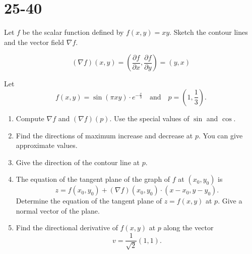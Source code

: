 \section{25-40}

\begin{exercise}
	Let $f$ be the scalar function defined by $f(x,y) = xy$. Sketch the contour lines and the vector field $\nabla f$.
\end{exercise}

\begin{solution}
	$$
		(\nabla f)(x,y) = \left( \frac{\partial f}{\partial x}, \frac{\partial f}{\partial y} \right) = (y,x)
	$$
	\begin{center}
	\end{center}
\end{solution}

\begin{exercise}
	Let
	$$
		f(x,y) = \sin(\pi xy) \cdot e^{-\frac{x}{3}} \quad \text{and} \quad p = \left(1, \frac{1}{3}\right).
	$$
	\begin{enumerate}
		\item Compute $\nabla f$ and $(\nabla f)(p)$. Use the special values of $\sin$ and $\cos$.
		\item Find the directions of maximum increase and decrease at $p$. You can give approximate values.
		\item Give the direction of the contour line at $p$.
		\item The equation of the tangent plane of the graph of $f$ at $(x_0, y_0)$ is
		      $$
			      z = f(x_0, y_0) + (\nabla f)(x_0, y_0) \cdot (x - x_0, y - y_0).
		      $$
		      Determine the equation of the tangent plane of $z = f(x,y)$ at $p$. Give a normal vector of the plane.
		\item Find the directional derivative of $f(x,y)$ at $p$ along the vector
		      $$
			      v = \frac{1}{\sqrt{2}} (1,1).
		      $$
	\end{enumerate}
\end{exercise}

